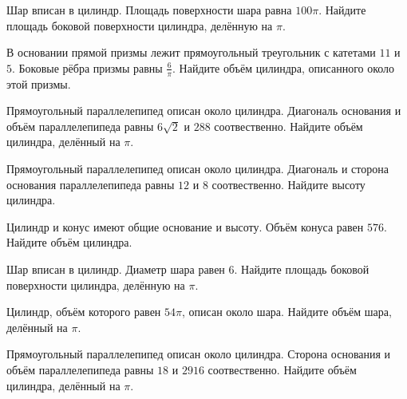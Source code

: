 \documentclass[4apaper]{article}
\begin{document}
\begin{taskBN}{58}
Шар вписан в цилиндр. Площадь поверхности шара равна $100\pi$. Найдите площадь боковой поверхности цилиндра, делённую на $\pi$.
\end{taskBN}

\begin{taskBN}{59}
В основании прямой призмы лежит прямоугольный треугольник с катетами $11$ и $5$. Боковые рёбра призмы равны $\frac{6}{\pi}$. Найдите объём цилиндра, описанного около этой призмы.
\end{taskBN}

\begin{taskBN}{60}
Прямоугольный параллелепипед описан около цилиндра. Диагональ основания и объём параллелепипеда равны $6\sqrt{2}$ и $288$ соотвественно. Найдите объём цилиндра, делённый на $\pi$.
\end{taskBN}

\begin{taskBN}{61}
Прямоугольный параллелепипед описан около цилиндра. Диагональ и сторона основания параллелепипеда равны $12$ и $8$ соотвественно. Найдите высоту цилиндра.
\end{taskBN}

\begin{taskBN}{62}
Цилиндр и конус имеют общие основание и высоту. Объём конуса равен $576$. Найдите объём цилиндра.
\end{taskBN}

\begin{taskBN}{63}
Шар вписан в цилиндр. Диаметр шара равен $6$. Найдите площадь боковой поверхности цилиндра, делённую на $\pi$.
\end{taskBN}

\begin{taskBN}{64}
 Цилиндр, объём которого равен $54\pi$, описан около шара. Найдите объём шара, делённый на $\pi$.
\end{taskBN}

\begin{taskBN}{65}
Прямоугольный параллелепипед описан около цилиндра. Сторона основания и объём параллелепипеда равны $18$ и $2916$ соотвественно. Найдите объём цилиндра, делённый на $\pi$.
\end{taskBN}
\end{document}
